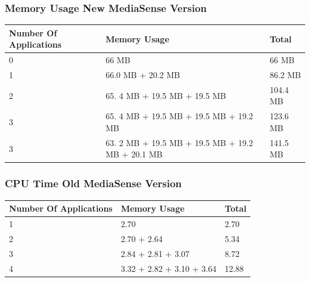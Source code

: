 \subsubsection{Memory Usage New MediaSense Version}
\begin{center}
    \begin{tabular}{ | l | p{9cm} | l |}
    \hline
    Number Of Applications 								& Memory Usage 											& Total\\ \hline
    0 													& 66 MB 												& 66 MB\\ \hline
    1 													& 66.0 MB + 20.2 MB 									& 86.2 MB\\ \hline
    2 													& 65. 4 MB + 19.5 MB + 19.5 MB  						& 104.4 MB\\ \hline
    3 													& 65. 4 MB + 19.5 MB + 19.5 MB + 19.2 MB  				& 123.6 MB\\ \hline
    3 													& 63. 2 MB + 19.5 MB + 19.5 MB + 19.2 MB + 20.1 MB 	& 141.5 MB\\ \hline
    \end{tabular}
\end{center}




\subsubsection{CPU Time Old MediaSense Version}
\begin{center}
    \begin{tabular}{ | l | p{9cm} | l |}
    \hline
    Number Of Applications 								& Memory Usage 									& Total\\ \hline
    1 													& 2.70 											& 2.70\\ \hline
    2 													& 2.70 + 2.64									& 5.34\\ \hline
    3 													& 2.84 + 2.81 + 3.07 							& 8.72\\ \hline
    4 													& 3.32 + 2.82 + 3.10 + 3.64						& 12.88\\ \hline
    \end{tabular}
\end{center}

